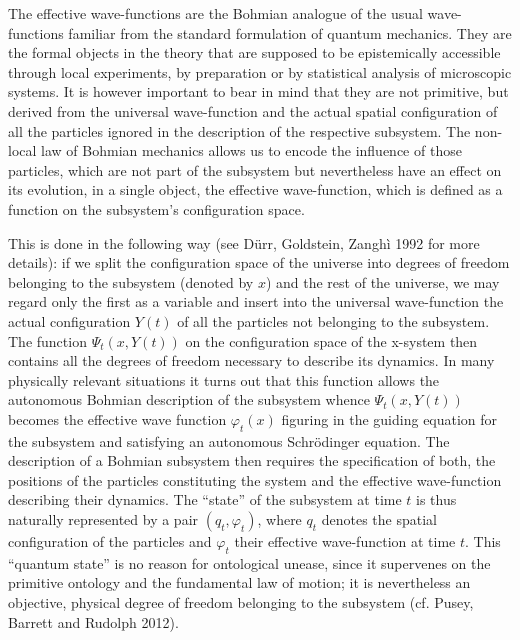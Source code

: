 \documentclass[12pt]{article}
\theoremstyle{definition}
\begin{document}
The effective wave-functions are the Bohmian analogue of the usual wave-functions familiar from the standard formulation of quantum mechanics. They are the formal objects in the theory that are supposed to be epistemically accessible through local experiments, by preparation or by statistical analysis of microscopic systems. It is however important to bear in mind that they are not primitive, but derived from the universal wave-function and the actual spatial configuration of all the particles ignored in the description of the respective subsystem. The non-local law of Bohmian mechanics allows us to encode the influence of those particles, which are not part of the subsystem but nevertheless have an effect on its evolution, in a single object, the effective wave-function, which is defined as a function on the subsystem's configuration space.

This is done in the following way (see D\"urr, Goldstein, Zangh\`i 1992 for more details): if we split the configuration space of the universe into degrees of freedom belonging to the subsystem (denoted by $x$) and the rest of the universe, we may regard only the first as a variable and insert into the universal wave-function the actual configuration $Y(t)$ of all the particles not belonging to the subsystem. The function $\Psi_t(x,Y(t))$ on the configuration space of the x-system then contains all the degrees of freedom necessary to describe its dynamics. In many physically relevant situations it turns out that this function allows the autonomous Bohmian description of the subsystem whence $\Psi_t(x,Y(t))$ becomes the effective wave function $\varphi_t(x)$ figuring in the guiding equation for the subsystem and satisfying an autonomous Schr\"odinger equation. The description of a Bohmian subsystem then requires the specification of both, the positions of the particles constituting the system and the effective wave-function describing their dynamics. The ``state'' of the subsystem at time $t$ is thus naturally represented by a pair $(q_t, \varphi_t)$, where $q_t$ denotes the spatial configuration of the particles and $\varphi_t$ their effective wave-function at time $t$. This ``quantum state'' is no reason for ontological unease, since it supervenes on the primitive ontology and the fundamental law of motion; it is nevertheless an objective, physical degree of freedom belonging to the subsystem (cf. Pusey, Barrett and Rudolph 2012).
\end{document}
